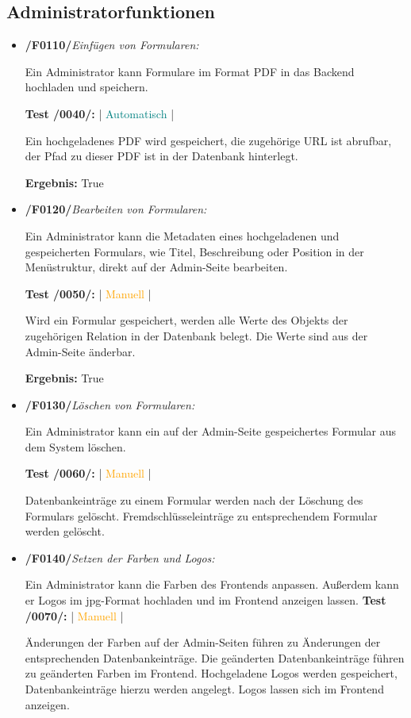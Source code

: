 \subsection{Administratorfunktionen}

    \begin{itemize}
        \item \textbf{/F0110/}\textit{Einfügen von Formularen:}\par
        Ein Administrator kann Formulare im Format PDF in das Backend hochladen und speichern.\par
        \noindent \textbf{Test /0040/:} | \textcolor{teal}{Automatisch} |\par 
        Ein hochgeladenes PDF wird gespeichert, die zugehörige URL ist abrufbar, der Pfad zu dieser PDF ist in der Datenbank hinterlegt.\par
        \noindent \textbf{Ergebnis:} True
        
        \item \textbf{/F0120/}\textit{Bearbeiten von Formularen:} \par
        Ein Administrator kann die Metadaten eines hochgeladenen und gespeicherten Formulars, wie Titel, Beschreibung oder Position in der Menüstruktur, direkt auf der Admin-Seite bearbeiten.\par
        \noindent \textbf{Test /0050/:} | \textcolor{orange}{Manuell} |\par 
        Wird ein Formular gespeichert, werden alle Werte des Objekts der zugehörigen Relation in der Datenbank belegt. Die Werte sind aus der Admin-Seite änderbar.\par
        \noindent \textbf{Ergebnis:} True
        
        \newpage
        
        \item \textbf{/F0130/}\textit{Löschen von Formularen:} \par
        Ein Administrator kann ein auf der Admin-Seite gespeichertes Formular aus dem System löschen.\par
        \noindent \textbf{Test /0060/:} | \textcolor{orange}{Manuell} |\par Datenbankeinträge zu einem Formular werden nach der Löschung des Formulars gelöscht. Fremdschlüsseleinträge zu entsprechendem Formular werden gelöscht.\par
        
        \item \textbf{/F0140/}\textit{Setzen der Farben und Logos:} \par 
        Ein Administrator kann die Farben des Frontends anpassen. Außerdem kann er Logos im jpg-Format hochladen und im Frontend anzeigen lassen.
        \noindent \textbf{Test /0070/:} | \textcolor{orange}{Manuell} |\par
        Änderungen der Farben auf der Admin-Seiten führen zu Änderungen der entsprechenden Datenbankeinträge. Die geänderten Datenbankeinträge führen zu geänderten Farben im Frontend. Hochgeladene Logos werden gespeichert, Datenbankeinträge hierzu werden angelegt. Logos lassen sich im Frontend anzeigen.\par
        

\end{itemize}
